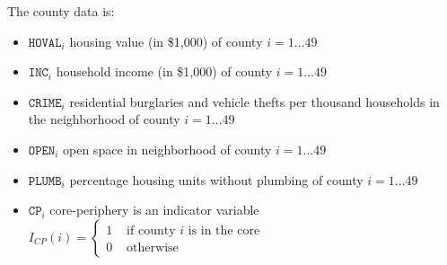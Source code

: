 \documentclass[
]{article}
\providecommand{\tightlist}{%
  \setlength{\itemsep}{0pt}\setlength{\parskip}{0pt}}
\begin{document}
The county data is:

\begin{itemize}
\tightlist
\item
  \(\texttt{HOVAL}_i\) housing value (in \$1,000) of county
  \(i=1\dots49\)
\item
  \(\texttt{INC}_i\) household income (in \$1,000) of county
  \(i=1\dots49\)
\item
  \(\texttt{CRIME}_i\) residential burglaries and vehicle thefts per
  thousand households in the neighborhood of county \(i=1\dots49\)
\item
  \(\texttt{OPEN}_i\) open space in neighborhood of county
  \(i=1\dots49\)
\item
  \(\texttt{PLUMB}_i\) percentage housing units without plumbing of
  county \(i=1\dots49\)
\item
  \(\texttt{CP}_i\) core-periphery is an indicator variable
  \(I_{CP}(i)= \begin{cases}1 & \text { if county } i \text { is in the core } \\ 0 & \text { otherwise }\end{cases}\)
\end{itemize}
\end{document}
